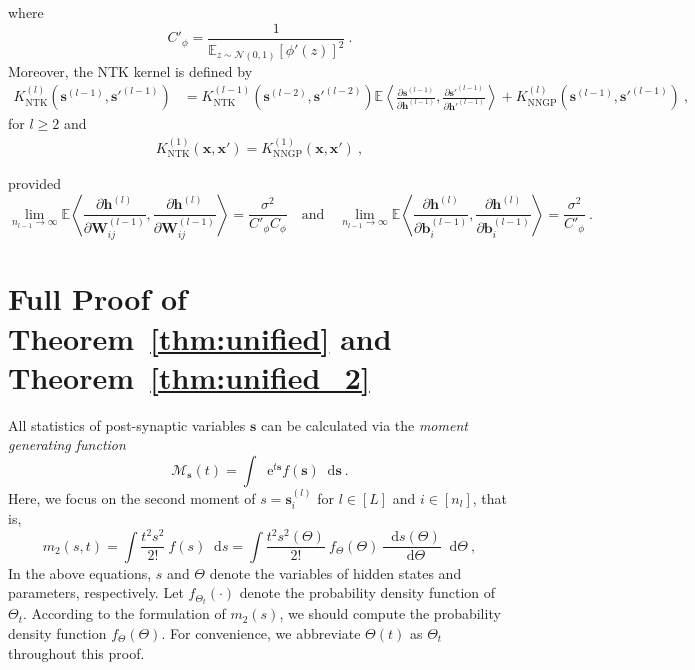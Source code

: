 \documentclass[review,10pt]{JMtemplate}
\newcommand*{\dif}{\mathop{}\!\mathrm{d}}
\newcommand*{\e}{\mathop{}\!\mathrm{e}}
\begin{document}
where 
\[
C'_{\phi} = \frac{1}{\mathbb{E}_{z \sim \mathcal{N}(0,1)} \left[ \phi'(z) \right]^2   }  \ .
\]
Moreover, the NTK kernel is defined by
\[
\begin{aligned}
K_{\textrm{NTK}}^{(l)} \left(  \boldsymbol{s}^{(l-1)}, \boldsymbol{s}'^{(l-1)} \right) 
& = K_{\textrm{NTK}}^{(l-1)} \left(  \boldsymbol{s}^{(l-2)}, \boldsymbol{s}'^{(l-2)} \right) \mathbb{E} \left\langle \frac{\partial \boldsymbol{s}^{(l-1)}}{\partial \boldsymbol{h}^{(l-1)}},  \frac{\partial \boldsymbol{s}'^{(l-1)}}{\partial \boldsymbol{h}'^{(l-1)}} \right\rangle  + K_{\textrm{NNGP}}^{(l)} \left( \boldsymbol{s}^{(l-1)}, \boldsymbol{s}'^{(l-1)} \right) \ ,
\end{aligned}
\]
for $l \geq 2$ and
\[
\begin{aligned}
	K_{\textrm{NTK}}^{(1)} \left(  \boldsymbol{x}, \boldsymbol{x}' \right)  = K_{\textrm{NNGP}}^{(1)} \left(  \boldsymbol{x}, \boldsymbol{x}' \right)  \ ,
\end{aligned}
\]

provided
\[
\lim\limits_{n_{l-1} \to \infty} \mathbb{E} \left\langle \frac{\partial \boldsymbol{h}^{(l)}}{\partial \mathbf{W}_{ij}^{(l-1)}} , \frac{\partial \boldsymbol{h}^{(l)}}{\partial \mathbf{W}_{ij}^{(l-1)}}  \right\rangle  =  \frac{\sigma^2}{C'_{\phi} C_{\phi} } 
\quad\text{and}\quad
\lim\limits_{n_{l-1} \to \infty} \mathbb{E} \left\langle \frac{\partial \boldsymbol{h}^{(l)}}{\partial \boldsymbol{b}_i^{(l-1)} } , \frac{\partial \boldsymbol{h}^{(l)}}{\partial \boldsymbol{b}_i^{(l-1)} }  \right\rangle  =  \frac{\sigma^2}{C'_{\phi} } \ .
\]




\section{Full Proof of Theorem~\ref{thm:unified} and Theorem~\ref{thm:unified_2}}  \label{app:unified}
All statistics of post-synaptic variables $\boldsymbol{s}$ can be calculated via the \emph{moment generating function}
\[
\mathcal{M}_{\boldsymbol{s}} (t) = \int \e^{t \boldsymbol{s}}  f(\boldsymbol{s}) \dif \boldsymbol{s} \ .
\]
Here, we focus on the second moment of $s= \boldsymbol{s}^{(l)}_i$ for $l \in [L]$ and $i \in [n_l]$, that is,
\[
m_2 (s,t) = \int \frac{t^2s^2}{2!}  ~f(s) \dif s = \int \frac{t^2 s^2(\Theta)}{2!}  ~f_{\Theta}(\Theta) ~\frac{\dif s(\Theta)}{\dif \Theta} \dif \Theta \ ,
\]
In the above equations, $s$ and $\Theta$ denote the variables of hidden states and parameters, respectively. Let $f_{\Theta_t}(\cdot)$ denote the probability density function of $\Theta_t$. According to the formulation of $m_2 (s)$, we should compute the probability density function $f_{\Theta}(\Theta)$. For convenience, we abbreviate $\Theta(t)$ as $\Theta_t$ throughout this proof. 
\end{document}
